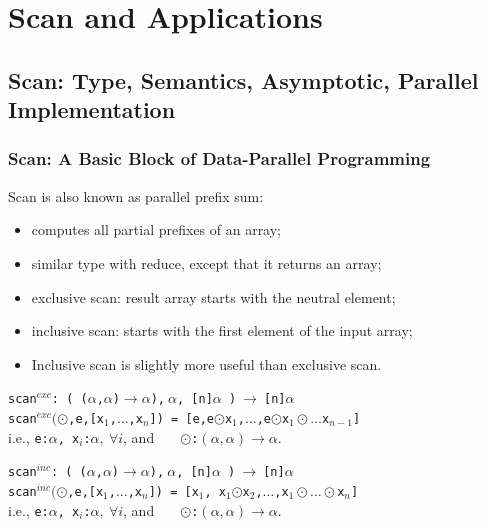 \documentclass{beamer}
\renewcommand{\emph}[1]{\textcolor{CosGreen}{ #1}}
\newcommand{\emp}[1]{\textcolor{DikuRed}{ #1}}
\begin{document}
\section{Scan and Applications}

\begin{frame}
  \tableofcontents[currentsection]
\end{frame}

\subsection{Scan: Type, Semantics, Asymptotic, Parallel Implementation}

\begin{frame}[fragile,t]
  \frametitle{Scan: A Basic Block of Data-Parallel Programming}

Scan is also known as parallel prefix sum:
\begin{itemize}
\item computes all partial prefixes of an array;
\item similar type with reduce, except that it returns an array;\medskip
\item \emp{exclusive scan}: result array starts with the neutral element;
\item \emph{inclusive scan}: starts with the first element of the input array;\medskip
\item Inclusive scan is slightly more useful than exclusive scan.
\end{itemize}\bigskip\pause

\emp{{\tt scan$^{exc}$: ( ($\alpha$,$\alpha$)$\rightarrow\alpha$),$~\alpha$, [n]$\alpha$ )$~\rightarrow~$[n]$\alpha$}}\\
        \emph{\tt scan$^{exc}(\odot$,e,[x$_1$,$\ldots$,x$_n$])~=~[e,e$\odot$x$_1$,$\ldots$,e$\odot$x$_1\odot\ldots$x$_{n-1}$]}\\
        i.e., \emp{{\tt{}e:$\alpha$, x$_i$:$\alpha,~\forall i$}}, and 
        \emp{\tt~~~$\odot$:$(\alpha,\alpha)\rightarrow\alpha$}.\bigskip

\emp{{\tt scan$^{inc}$: ( ($\alpha$,$\alpha$)$\rightarrow\alpha$),$~\alpha$, [n]$\alpha$ )$~\rightarrow~$[n]$\alpha$}}\\
        \emph{\tt scan$^{inc}(\odot$,e,[x$_1$,$\ldots$,x$_n$])~=~[x$_1$,~x$_1$$\odot$x$_2$,$\ldots$,x$_1\odot\ldots\odot$x$_{n}$]}\\
        i.e., \emp{{\tt{}e:$\alpha$, x$_i$:$\alpha,~\forall i$}}, and 
        \emp{\tt~~~$\odot$:$(\alpha,\alpha)\rightarrow\alpha$}.

\end{frame}
\end{document}
